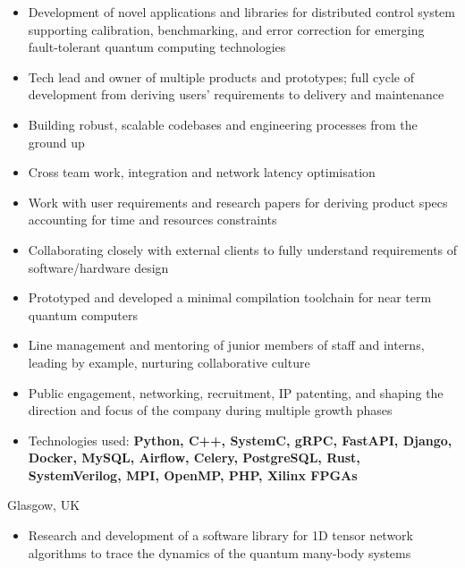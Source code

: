 \documentclass[10pt,a4paper,ragged2e,withhyper]{altacv}
\begin{document}
\begin{paracol}{2}
\begin{itemize}
    \item Development of novel applications and libraries for
    distributed control system supporting calibration, benchmarking,
    and error correction for emerging fault-tolerant quantum computing
    technologies

    \item Tech lead and owner of multiple products and prototypes;
    full cycle of development from deriving users' requirements to
    delivery and maintenance

    \item Building robust, scalable codebases and engineering processes
    from the ground up

    \item Cross team work, integration and network latency optimisation

    \item Work with user requirements and research papers for deriving product
    specs accounting for time and resources constraints
    
    \item Collaborating closely with external clients to fully understand
    requirements of software/hardware design

    \item Prototyped and developed a minimal compilation toolchain for near
    term quantum computers 
    
    \item Line management and mentoring of junior members of staff and interns,
    leading by example, nurturing collaborative culture

    \item Public engagement, networking, recruitment, IP patenting,
    and shaping the direction and focus of the company during multiple growth
    phases

    \item Technologies used:
    {\bf Python, C++, SystemC, gRPC, FastAPI, Django, Docker, MySQL, Airflow,
    Celery, PostgreSQL, Rust, SystemVerilog, MPI, OpenMP, PHP, Xilinx FPGAs}
\end{itemize}

\divider

{Glasgow, UK}

\begin{itemize}
    \item Research and development of a software library for 1D tensor network
    algorithms to trace the dynamics of the quantum many-body systems


\end{itemize}
\end{paracol}
\end{document}
